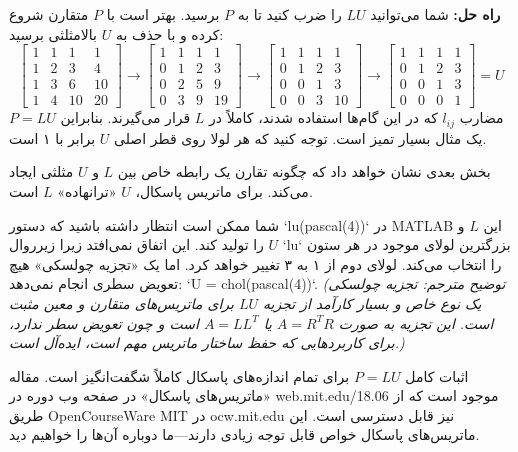 \documentclass[12pt, a4paper]{book}
\begin{document}
	\textbf{راه حل:} شما می‌توانید $LU$ را ضرب کنید تا به $P$ برسید. بهتر است با $P$ متقارن شروع کرده و با حذف به $U$ بالامثلثی برسید:
	\[
	\begin{bmatrix} 1 & 1 & 1 & 1 \\ 1 & 2 & 3 & 4 \\ 1 & 3 & 6 & 10 \\ 1 & 4 & 10 & 20 \end{bmatrix} \to \begin{bmatrix} 1 & 1 & 1 & 1 \\ 0 & 1 & 2 & 3 \\ 0 & 2 & 5 & 9 \\ 0 & 3 & 9 & 19 \end{bmatrix} \to \begin{bmatrix} 1 & 1 & 1 & 1 \\ 0 & 1 & 2 & 3 \\ 0 & 0 & 1 & 3 \\ 0 & 0 & 3 & 10 \end{bmatrix} \to \begin{bmatrix} 1 & 1 & 1 & 1 \\ 0 & 1 & 2 & 3 \\ 0 & 0 & 1 & 3 \\ 0 & 0 & 0 & 1 \end{bmatrix} = U
	\]
	مضارب $l_{ij}$ که در این گام‌ها استفاده شدند، کاملاً در $L$ قرار می‌گیرند. بنابراین $P=LU$ یک مثال بسیار تمیز است. توجه کنید که هر لولا روی قطر اصلی $U$ برابر با ۱ است.
	
	بخش بعدی نشان خواهد داد که چگونه تقارن یک رابطه خاص بین $L$ و $U$ مثلثی ایجاد می‌کند. برای ماتریس پاسکال، $U$ «ترانهاده» $L$ است.
	
	شما ممکن است انتظار داشته باشید که دستور `lu(pascal(4))` در MATLAB این $L$ و $U$ را تولید کند. این اتفاق نمی‌افتد زیرا زیرروال `lu` بزرگترین لولای موجود در هر ستون را انتخاب می‌کند. لولای دوم از ۱ به ۳ تغییر خواهد کرد. اما یک «تجزیه چولسکی» هیچ تعویض سطری انجام نمی‌دهد: `U = chol(pascal(4))`.
	\textit{(توضیح مترجم: تجزیه چولسکی یک نوع خاص و بسیار کارآمد از تجزیه $LU$ برای ماتریس‌های متقارن و معین مثبت است. این تجزیه به صورت $A=R^TR$ یا $A=LL^T$ است و چون تعویض سطر ندارد، برای کاربردهایی که حفظ ساختار ماتریس مهم است، ایده‌آل است.)}
	
	اثبات کامل $P=LU$ برای تمام اندازه‌های پاسکال کاملاً شگفت‌انگیز است. مقاله «ماتریس‌های پاسکال» در صفحه وب دوره در web.mit.edu/18.06 موجود است که از طریق OpenCourseWare MIT در ocw.mit.edu نیز قابل دسترسی است. این ماتریس‌های پاسکال خواص قابل توجه زیادی دارند—ما دوباره آن‌ها را خواهیم دید.
	
\end{document}

